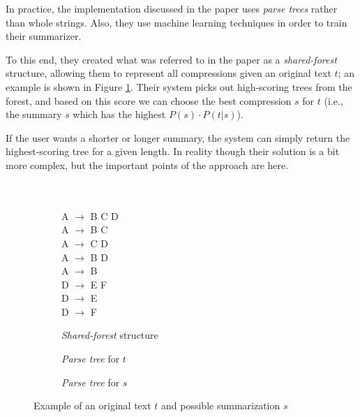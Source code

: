 In practice, the implementation discussed in the paper uses \textit{parse trees} rather than whole strings. Also, they use machine learning techniques in order to train their summarizer.

To this end, they created what was referred to in the paper as a \textit{shared-forest} structure, allowing them to represent all compressions given an original text $t$; an example is shown in Figure \ref{fig:statistics_example}. Their system picks out high-scoring trees from the forest, and based on this score we can choose the best compression $s$ for $t$ (i.e., the summary $s$ which has the highest $P(s) \cdot P(t \vert s)$).

If the user wants a shorter or longer summary, the system can simply return the highest-scoring tree for a given length. In reality though their solution is a bit more complex, but the important points of the approach are here.

\begin{figure}[H]
\begin{subfigure}{0.3\textwidth}
\quad \\
\quad \\
\phantom{\qquad}A $\rightarrow$ B C D \\
\phantom{\qquad}A $\rightarrow$ B C \\
\phantom{\qquad}A $\rightarrow$ C D \\
\phantom{\qquad}A $\rightarrow$ B D \\
\phantom{\qquad}A $\rightarrow$ B \\
\phantom{\qquad}D $\rightarrow$ E F \\
\phantom{\qquad}D $\rightarrow$ E \\
\phantom{\qquad}D $\rightarrow$ F \\
\caption{\textit{Shared-forest} structure}
\end{subfigure}
\begin{subfigure}{0.4\textwidth}
\centering
{}
\caption{\textit{Parse tree} for $t$}
\end{subfigure}
\begin{subfigure}{0.25\textwidth}
\centering
{}
\caption{\textit{Parse tree} for $s$}
\end{subfigure}
\caption{Example of an original text $t$ and possible summarization $s$}
\label{fig:statistics_example}
\end{figure}

